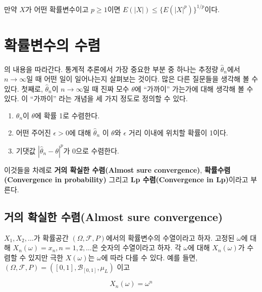 \documentclass[b5paper,]{scrbook}
\theoremstyle{plain}
\theoremstyle{definition}
\numberwithin{equation}{section}
\let\BeginKnitrBlock\begin \let\EndKnitrBlock\end
\begin{document}
\BeginKnitrBlock{corollary}[젠슨 부등식의 따름정리]
\protect\hypertarget{cor:unnamed-chunk-111}{}{\label{cor:unnamed-chunk-111} {} }만약 \(X\)가 어떤 확률변수이고 \(p\geq 1\)이면 \(E(|X|)\leq \{ E(|X|^{p}) \}^{1/p}\)이다.
\EndKnitrBlock{corollary}

\hypertarget{convergencerv}{%
\chapter{확률변수의 수렴}\label{convergencerv}}

\citep{Proschan2016}의 내용을 따라간다. 통계적 추론에서 가장 중요한 부분 중 하나는 추정량 \(\hat{\theta}_{n}\)에서 \(n\rightarrow\infty\)일 때 어떤 일이 일어나는지 살펴보는 것이다. 많은 다른 질문들을 생각해 볼 수 있다. 첫째로, \(\hat{\theta}_{n}\)이 \(n\rightarrow\infty\)일 때 진짜 모수 \(\theta\)에 ``가까이'' 가는가에 대해 생각해 볼 수 있다. 이 ``가까이'' 라는 개념을 세 가지 정도로 정의할 수 있다.

\begin{enumerate}
\def\labelenumi{\arabic{enumi}.}
\item
  \(\theta_{n}\)이 \(\theta\)에 확률 1로 수렴한다.
\item
  어떤 주어진 \(\epsilon >0\)에 대해 \(\hat{\theta}_{n}\) 이 \(\theta\)와 \(\epsilon\) 거리 이내에 위치할 확률이 1이다.
\item
  기댓값 \(|\hat{\theta}_{n}-\theta|^{p}\)가 0으로 수렴한다.
\end{enumerate}

이것들을 차례로 \textbf{거의 확실한 수렴(Almost sure convergence)}, \textbf{확률수렴(Convergence in probability)} 그리고 \textbf{Lp 수렴(Convergence in Lp)}이라고 부른다.

\hypertarget{--almost-sure-convergence}{%
\section{거의 확실한 수렴(Almost sure convergence)}\label{--almost-sure-convergence}}

\(X_{1}, X_{2},\ldots\)가 확률공간 \((\Omega, \mathcal{F}, P)\)에서의 확률변수의 수열이라고 하자. 고정된 \(\omega\)에 대해 \(X_{n}(\omega)=x_{n}, n=1,2,\ldots\)은 숫자의 수열이라고 하자. 각 \(\omega\)에 대해 \(X_{n}(\omega)\)가 수렴할 수 있지만 극한 \(X(\omega)\)는 \(\omega\)에 따라 다를 수 있다. 예를 들면, \((\Omega, \mathcal{F}, P)=([0,1],\mathcal{B}_{[0,1]},\mu_{L})\) 이고

\begin{equation}
X_{n}(\omega)=\omega^{n}
\label{eq:almostsureex01}
\end{equation}
\end{document}

